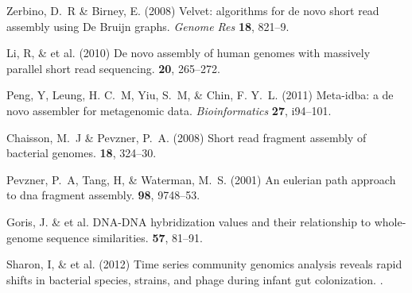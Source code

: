 \documentclass{pnastwo}
\begin{document}
\begin{article}
\begin{thebibliography}{10}
%


 Zerbino, D.~R \& Birney, E. \newblock (2008) Velvet:
algorithms for de novo short read assembly using De Bruijn graphs. \newblock
{\em Genome Res} {\bf 18}, 821--9.

 Li, R, \& et al. \newblock
(2010) {De novo assembly of human genomes with massively parallel short read
sequencing}.  {\bf 20}, 265--272.


 Peng, Y, Leung, H. C.~M, Yiu, S.~M, \& Chin, F. Y.~L.
\newblock (2011) Meta-idba: a de novo assembler for metagenomic data. \newblock
{\em Bioinformatics} {\bf 27}, i94--101.

 Chaisson, M.~J \& Pevzner, P.~A. \newblock (2008)
Short read fragment assembly of bacterial genomes.  {\bf 18}, 324--30.

 Pevzner, P.~A, Tang, H, \& Waterman, M.~S. \newblock
(2001) An eulerian path approach to dna fragment assembly.  {\bf 98}, 9748--53.

 Goris, J. \& et al. DNA-DNA hybridization values and their relationship to whole-genome
sequence similarities.  {\bf 57}, 81--91.

 Sharon, I, \& et al. \newblock (2012) {Time series community
genomics analysis reveals rapid shifts in bacterial species, strains, and phage
during infant gut colonization}. .



\end{thebibliography}
\end{article}
\end{document}
